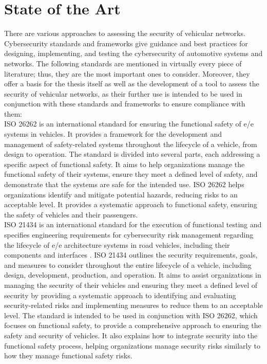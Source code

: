 \chapter{State of the Art}
\label{chp:stateoftheart}

There are various approaches to assessing the security of vehicular networks. Cybersecurity standards and frameworks give guidance and best practices for designing, implementing, and testing the cybersecurity of automotive systems and networks. 
The following standards are mentioned in virtually every piece of literature; thus, they are the most important ones to consider. 
Moreover, they offer a basis for the thesis itself as well as the development of a tool to assess the security of vehicular networks,
as their further use is intended to be used in conjunction with these standards and frameworks to ensure compliance with them:\\

ISO 26262 is an international standard for ensuring the functional safety of \acrshort{e/e} systems in vehicles. 
It provides a framework for the development and management of safety-related systems throughout the lifecycle of a vehicle, from design to operation.
The standard is divided into several parts, each addressing a specific aspect of functional safety. 
It aims to help organizations manage the functional safety of their systems, ensure they meet a defined level of safety, and demonstrate that the systems are safe for the intended use.
ISO 26262 helps organizations identify and mitigate potential hazards, reducing risks to an acceptable level. 
It provides a systematic approach to functional safety, ensuring the safety of vehicles and their passengers.\\

ISO 21434 is an international standard for the execution of functional testing and specifies engineering requirements for cybersecurity risk 
management regarding the lifecycle of \acrshort{e/e} architecture systems in road vehicles, including their components and interfaces \cite{iso21434}.
ISO 21434 outlines the security requirements, goals, and measures to consider throughout the entire lifecycle of a vehicle, including design, development, production, and operation. 
It aims to assist organizations in managing the security of their vehicles and ensuring they meet a defined level of security by providing a systematic approach to identifying and evaluating security-related risks and implementing measures to reduce them to an acceptable level. 
The standard is intended to be used in conjunction with ISO 26262, which focuses on functional safety, to provide a comprehensive approach to ensuring the safety and security of vehicles. 
It also explains how to integrate security into the functional safety process, helping organizations manage security risks similarly to how they manage functional safety risks.\\

